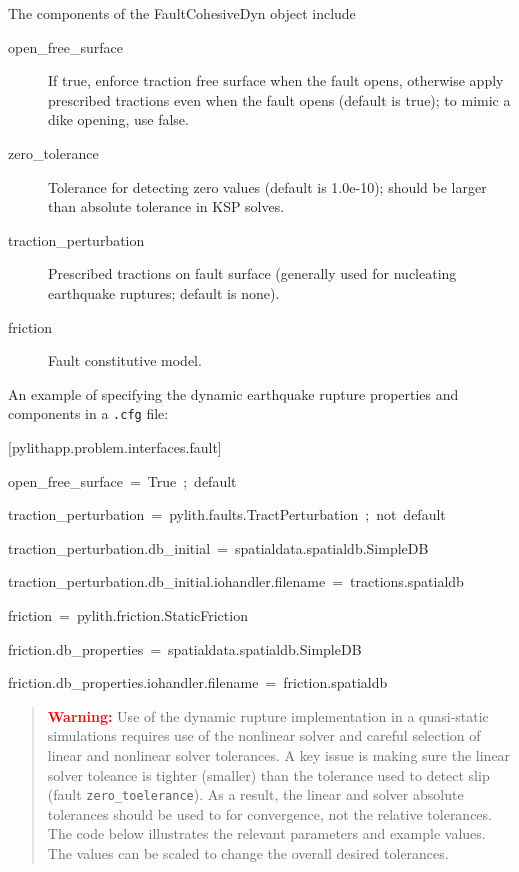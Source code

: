 The components of the FaultCohesiveDyn object include
\begin{description}
\item [{open\_free\_surface}] If true, enforce traction free surface when
the fault opens, otherwise apply prescribed tractions even when the
fault opens (default is true); to mimic a dike opening, use false.
\item [{zero\_tolerance}] Tolerance for detecting zero values (default
is 1.0e-10); should be larger than absolute tolerance in KSP solves.
\item [{traction\_perturbation}] Prescribed tractions on fault surface
(generally used for nucleating earthquake ruptures; default is none).
\item [{friction}] Fault constitutive model.
\end{description}
An example of specifying the dynamic earthquake rupture properties
and components in a \texttt{.cfg} file:
\begin{lyxcode}
{[}pylithapp.problem.interfaces.fault{]}

open\_free\_surface~=~True~;~default

traction\_perturbation~=~pylith.faults.TractPerturbation~;~not~default

traction\_perturbation.db\_initial~=~spatialdata.spatialdb.SimpleDB

traction\_perturbation.db\_initial.iohandler.filename~=~tractions.spatialdb

friction~=~pylith.friction.StaticFriction

friction.db\_properties~=~spatialdata.spatialdb.SimpleDB

friction.db\_properties.iohandler.filename~=~friction.spatialdb\end{lyxcode}
\begin{quote}
\textbf{\textcolor{red}{Warning:}}\textbf{ }Use of the dynamic rupture
implementation in a quasi-static simulations requires use of the nonlinear
solver and careful selection of linear and nonlinear solver tolerances.
A key issue is making sure the linear solver toleance is tighter (smaller)
than the tolerance used to detect slip (fault \texttt{zero\_toelerance}).
As a result, the linear and solver absolute tolerances should be used
to for convergence, not the relative tolerances. The code below illustrates
the relevant parameters and example values. The values can be scaled
to change the overall desired tolerances.\end{quote}
